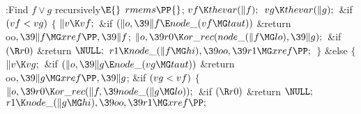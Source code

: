 \B{}:Find $f\lor g$ recursively\X${}\E{}$\6
$\\{rmems}\PP{}$;\6
${}\\{vf}\K\\{thevar}(\|f);{}$\6
${}\\{vg}\K\\{thevar}(\|g);{}$\6
\&{if} ${}(\\{vf}<\\{vg}){}$\5
${}\{{}$\1\6
${}\|v\K\\{vf};{}$\6
\&{if} ${}(\|o,\39\|f\E\\{node\_}(\\{vf}\MG\\{taut})){}$\1\5
\&{return} \\{oo}${},\39\|f\MG\\{xref}\PP,\39\|f{}$;\2\6
${}\|o,\39\\{r0}\K\\{or\_rec}(\\{node\_}(\|f\MG\\{lo}),\39\|g);{}$\6
\&{if} ${}(\R\\{r0}){}$\1\5
\&{return} ${}\NULL;{}$\2\6
${}\\{r1}\K\\{node\_}(\|f\MG\\{hi}),\39\\{oo},\39\\{r1}\MG\\{xref}\PP;{}$\6
\4${}\}{}$\5
\2\&{else}\5
${}\{{}$\1\6
${}\|v\K\\{vg};{}$\6
\&{if} ${}(\|o,\39\|g\E\\{node\_}(\\{vg}\MG\\{taut})){}$\1\5
\&{return} \\{oo}${},\39\|g\MG\\{xref}\PP,\39\|g{}$;\2\6
\&{if} ${}(\\{vg}<\\{vf}){}$\5
${}\{{}$\1\6
${}\|o,\39\\{r0}\K\\{or\_rec}(\|f,\39\\{node\_}(\|g\MG\\{lo}));{}$\6
\&{if} ${}(\R\\{r0}){}$\1\5
\&{return} ${}\NULL;{}$\2\6
${}\\{r1}\K\\{node\_}(\|g\MG\\{hi}),\39\\{oo},\39\\{r1}\MG\\{xref}\PP;{}$\6
